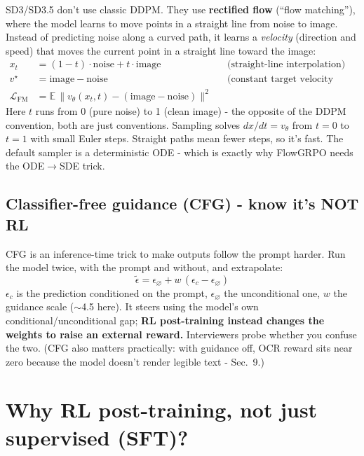 \documentclass[11pt]{article}
\begin{document}
SD3/SD3.5 don't use classic DDPM. They use \textbf{rectified flow} (``flow
matching''), where the model learns to move points in a straight line from noise to
image. Instead of predicting noise along a curved path, it learns a \textit{velocity}
(direction and speed) that moves the current point in a straight line toward the image:
\begin{align*}
x_t &= (1-t)\cdot\text{noise} + t\cdot\text{image} &&\text{(straight-line interpolation)}\\
v^\star &= \text{image} - \text{noise} &&\text{(constant target velocity along the line)}\\
\mathcal L_{\text{FM}} &= \mathbb E\,\lVert v_\theta(x_t,t) - (\text{image}-\text{noise})\rVert^2
\end{align*}
Here $t$ runs from 0 (pure noise) to 1 (clean image) - the opposite of the DDPM
convention, both are just conventions. Sampling solves $dx/dt = v_\theta$ from $t{=}0$
to $t{=}1$ with small Euler steps. Straight paths mean fewer steps, so it's fast. The
default sampler is a deterministic ODE - which is exactly why FlowGRPO needs the
ODE$\to$SDE trick.

\subsection{Classifier-free guidance (CFG) - know it's NOT RL}

CFG is an inference-time trick to make outputs follow the prompt harder. Run the model
twice, with the prompt and without, and extrapolate:
\[
\tilde\epsilon = \epsilon_\varnothing + w\,(\epsilon_c - \epsilon_\varnothing)
\]
$\epsilon_c$ is the prediction conditioned on the prompt, $\epsilon_\varnothing$ the
unconditional one, $w$ the guidance scale ($\sim$4.5 here). It steers using the
model's own conditional/unconditional gap; \textbf{RL post-training instead changes
the weights to raise an external reward.} Interviewers probe whether you confuse the
two. (CFG also matters practically: with guidance off, OCR reward sits near zero
because the model doesn't render legible text - Sec.~9.)

\section{Why RL post-training, not just supervised (SFT)?}
\end{document}
